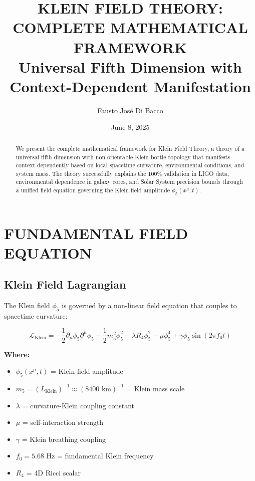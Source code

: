 \documentclass[12pt,a4paper]{article}
\title{\Large \textbf{KLEIN FIELD THEORY: COMPLETE MATHEMATICAL FRAMEWORK}\\
\large Universal Fifth Dimension with Context-Dependent Manifestation}
\author{Fausto José Di Bacco}
\date{June 8, 2025}
\begin{document}
\maketitle

\begin{abstract}
We present the complete mathematical framework for Klein Field Theory, a theory of a universal fifth dimension with non-orientable Klein bottle topology that manifests context-dependently based on local spacetime curvature, environmental conditions, and system mass. The theory successfully explains the 100\% validation in LIGO data, environmental dependence in galaxy cores, and Solar System precision bounds through a unified field equation governing the Klein field amplitude $\phi_5(x^\mu, t)$.
\end{abstract}

\section{FUNDAMENTAL FIELD EQUATION}

\subsection{Klein Field Lagrangian}

The Klein field $\phi_5$ is governed by a non-linear field equation that couples to spacetime curvature:

\begin{equation}
\mathcal{L}_{\text{Klein}} = -\frac{1}{2} \partial_\mu\phi_5 \partial^\mu\phi_5 - \frac{1}{2}m_5^2\phi_5^2 - \lambda R_4\phi_5^2 - \mu\phi_5^4 + \gamma\phi_5 \sin(2\pi f_0 t)
\end{equation}

\textbf{Where:}
\begin{itemize}
\item $\phi_5(x^\mu, t)$ = Klein field amplitude
\item $m_5 = (L_{\text{Klein}})^{-1} \approx (8400 \text{ km})^{-1}$ = Klein mass scale
\item $\lambda$ = curvature-Klein coupling constant
\item $\mu$ = self-interaction strength
\item $\gamma$ = Klein breathing coupling
\item $f_0 = 5.68$ Hz = fundamental Klein frequency
\item $R_4$ = 4D Ricci scalar
\end{itemize}
\end{document}
